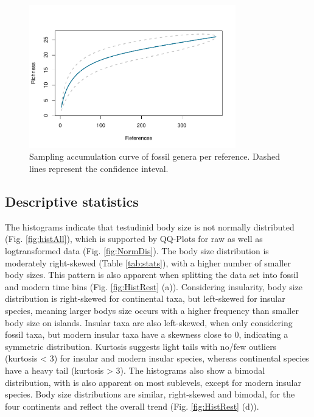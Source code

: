 \begin{figure}[htbp]
	\centering
	\includegraphics[width=0.8\textwidth]{MA_JJ_files/figure-latex/SACGenera-1.pdf}
	\caption[Sampling Accumulation Curve on generic level]{Sampling accumulation curve of fossil genera per reference. Dashed lines represent the confidence inteval.}
	\label{fig:SACGen}
\end{figure}


\FloatBarrier



\subsection{Descriptive statistics}

The histograms indicate that testudinid body size is not normally distributed (Fig. \ref{fig:histAll}), which is supported by QQ-Plots for raw as well as logtransformed data (Fig. \ref{fig:NormDis}).
The body size distribution is moderately right-skewed (Table \ref{tab:stats}), with a higher number of smaller body sizes. This pattern is also apparent when splitting the data set into fossil and modern time bins (Fig. \ref{fig:HistRest} (a)). Considering insularity, body size distribution is right-skewed for continental taxa, but left-skewed for insular species, meaning larger bodys size occurs with a higher frequency than smaller body size on islands. Insular taxa are also left-skewed, when only considering fossil taxa, but modern insular taxa have a skewness close to 0, indicating a symmetric distribution.
Kurtosis suggests light tails with no/few outliers (kurtosis < 3) for insular and modern insular species, whereas continental species have a heavy tail (kurtosis > 3).
The histograms also show a bimodal distribution, with is also apparent on most sublevels, except for modern insular species.
Body size distributions are similar, right-skewed and bimodal, for the four continents and reflect the overall trend (Fig. \ref{fig:HistRest} (d)).

